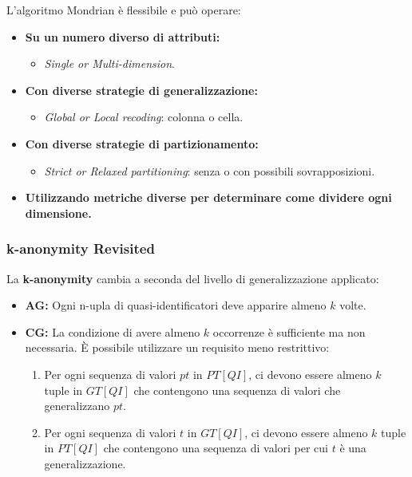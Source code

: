 \documentclass{report}
\begin{document}
\newpage \noindent L'algoritmo Mondrian è flessibile e può operare:
\begin{itemize}
    \item \textbf{Su un numero diverso di attributi:} 
    \begin{itemize}
        \item \textit{Single or Multi-dimension}.
    \end{itemize}
    \item \textbf{Con diverse strategie di generalizzazione:}
    \begin{itemize}
        \item \textit{Global or Local recoding}: colonna o cella.
    \end{itemize}
    \item \textbf{Con diverse strategie di partizionamento:} 
    \begin{itemize}
        \item \textit{Strict or Relaxed partitioning}: senza o con possibili sovrapposizioni.
    \end{itemize}
    \item \textbf{Utilizzando metriche diverse per determinare come dividere ogni dimensione.}
\end{itemize}

\subsubsection{k-anonymity Revisited}
La \textbf{k-anonymity} cambia a seconda del livello di generalizzazione applicato:

\begin{itemize}
    \item \textbf{AG:} Ogni n-upla di quasi-identificatori deve apparire almeno $k$ volte.
    \item \textbf{CG:} La condizione di avere almeno $k$ occorrenze è sufficiente ma non necessaria. È possibile utilizzare un requisito meno restrittivo:
    \begin{enumerate}
        \item Per ogni sequenza di valori $pt$ in $\mathit{PT[QI]}$, ci devono essere almeno $k$ tuple in $\mathit{GT[QI]}$ che contengono una sequenza di valori che generalizzano $pt$.
        \item Per ogni sequenza di valori $t$ in $\mathit{GT[QI]}$, ci devono essere almeno $k$ tuple in $\mathit{PT[QI]}$ che contengono una sequenza di valori per cui $t$ è una generalizzazione.
    \end{enumerate}
\end{itemize}
\end{document}
